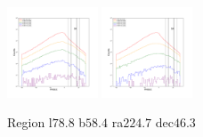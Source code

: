 \documentclass[12pt,prd]{article}
\begin{document}
\begin{figure}[h!]
\includegraphics[width=0.24\textwidth]{../figures/scanning_plotsgaiascan_l78_8_b58_4_ra224_7_dec46_3_npy_16.pdf}
\includegraphics[width=0.24\textwidth]{../figures/scanning_plotsgaiascan_l78_8_b58_4_ra224_7_dec46_3_npy_17.pdf}
\caption{Region l$78.8$ b$58.4$ ra$224.7$ dec$46.3$}
\end{figure}
\end{document}
